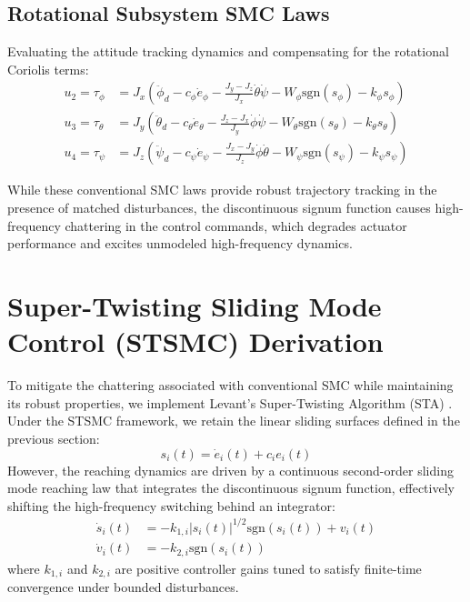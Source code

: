 \subsection{Rotational Subsystem SMC Laws}
Evaluating the attitude tracking dynamics and compensating for the rotational Coriolis terms:
\begin{align}
u_2 = \tau_{\phi} &= J_x \left( \ddot{\phi}_d - c_{\phi} \dot{e}_{\phi} - \frac{J_y - J_z}{J_x}\dot{\theta}\dot{\psi} - W_{\phi}\text{sgn}(s_{\phi}) - k_{\phi}s_{\phi} \right) \\
u_3 = \tau_{\theta} &= J_y \left( \ddot{\theta}_d - c_{\theta} \dot{e}_{\theta} - \frac{J_z - J_x}{J_y}\dot{\phi}\dot{\psi} - W_{\theta}\text{sgn}(s_{\theta}) - k_{\theta}s_{\theta} \right) \\
u_4 = \tau_{\psi} &= J_z \left( \ddot{\psi}_d - c_{\psi} \dot{e}_{\psi} - \frac{J_x - J_y}{J_z}\dot{\phi}\dot{\theta} - W_{\psi}\text{sgn}(s_{\psi}) - k_{\psi}s_{\psi} \right)
\end{align}

While these conventional SMC laws provide robust trajectory tracking in the presence of matched disturbances, the discontinuous signum function causes high-frequency chattering in the control commands, which degrades actuator performance and excites unmodeled high-frequency dynamics.

\section{Super-Twisting Sliding Mode Control (STSMC) Derivation}
To mitigate the chattering associated with conventional SMC while maintaining its robust properties, we implement Levant's Super-Twisting Algorithm (STA) \cite{ref_74, ref_76}. Under the STSMC framework, we retain the linear sliding surfaces defined in the previous section:
\begin{equation}
s_i(t) = \dot{e}_i(t) + c_i e_i(t)
\end{equation}
However, the reaching dynamics are driven by a continuous second-order sliding mode reaching law that integrates the discontinuous signum function, effectively shifting the high-frequency switching behind an integrator:
\begin{align}
\dot{s}_i(t) &= -k_{1,i} |s_i(t)|^{1/2} \text{sgn}(s_i(t)) + v_i(t) \\
\dot{v}_i(t) &= -k_{2,i} \text{sgn}(s_i(t))
\end{align}
where $k_{1,i}$ and $k_{2,i}$ are positive controller gains tuned to satisfy finite-time convergence under bounded disturbances.

